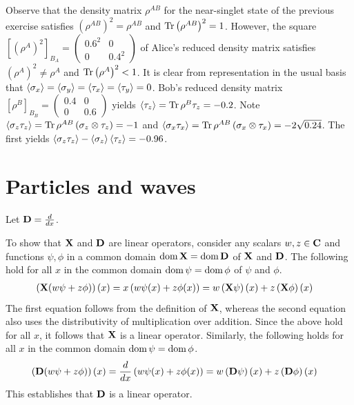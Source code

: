 \begin{answer}
	Observe that the density matrix $\rho^{AB}$ for the near-singlet state of the previous exercise satisfies $\left(\rho^{AB}\right)^2 = \rho^{AB}$ and $\operatorname{Tr} \left(\rho^{A B}\right)^2 = 1$.
	However, the square $\left[(\rho^{A})^2\right]_{B_A} = \begin{pmatrix} 0.6^2 & 0 \\ 0 & 0.4^2 \end{pmatrix}$ of Alice's reduced density matrix satisfies $\left(\rho^A\right)^2 \neq \rho^A$ and $\operatorname{Tr} \left(\rho^A\right)^2 < 1$.
	It is clear from representation in the usual basis that $\braket{\sigma_x} = \braket{\sigma_y} = \braket{\tau_x} = \braket{\tau_y} = 0$.
	Bob's reduced density matrix $\left[\rho^{B}\right]_{B_B} = \begin{pmatrix} 0.4 & 0 \\ 0 & 0.6 \end{pmatrix}$ yields $\braket{\tau_z} = \operatorname{Tr} \rho^B \tau_z = -0.2$.
	Note $\braket{\sigma_z \tau_z} = \operatorname{Tr} \rho^{AB}\left(\sigma_z \otimes \tau_z\right) = -1$ and $\braket{\sigma_x \tau_x} = \operatorname{Tr} \rho^{AB}\left(\sigma_x \otimes \tau_x\right) = -2 \sqrt{0.24}$.
	The first yields $\braket{\sigma_z \tau_z} - \braket{\sigma_z} \braket{\tau_z} = -0.96$.
\end{answer}

\section{Particles and waves}

Let $\mathbf{D} = \frac{d}{dx}$.

\begin{answer}
	To show that $\mathbf{X}$ and $\mathbf{D}$ are linear operators, consider any scalars $w,z \in \mathbf{C}$ and functions $\psi, \phi$ in a common domain $\operatorname{dom} \mathbf{X} = \operatorname{dom} \mathbf{D}$ of $\mathbf{X}$ and $\mathbf{D}$.
	The following hold for all $x$ in the common domain $\operatorname{dom} \psi = \operatorname{dom} \phi$ of $\psi$ and $\phi$.
	\begin{align}
		\left(\mathbf{X} (w \psi + z \phi)\right)(x) & = x \left(w \psi(x) + z \phi(x)\right) = w \left(\mathbf{X} \psi \right)(x) + z \left(\mathbf{X} \phi \right)(x)
	\end{align}
	The first equation follows from the definition of $\mathbf{X}$, whereas the second equation also uses the distributivity of multiplication over addition.
	Since the above hold for all $x$, it follows that $\mathbf{X}$ is a linear operator.
	Similarly, the following holds for all $x$ in the common domain $\operatorname{dom} \psi = \operatorname{dom} \phi$.
	\begin{align*}
		\left(\mathbf{D} (w \psi + z \phi)\right)(x) & = \frac{d}{dx} \left(w \psi(x) + z \phi(x)\right) = w \left(\mathbf{D} \psi \right)(x) + z \left(\mathbf{D} \phi \right)(x)
	\end{align*}
	This establishes that $\mathbf{D}$ is a linear operator.
\end{answer}


